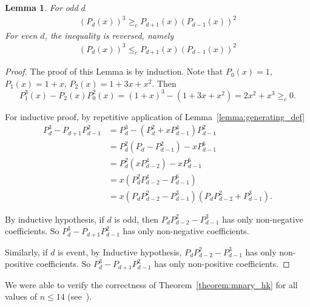 \documentclass{amsart}
\newtheorem{lemma}[theorem]{Lemma}
\theoremstyle{definition}
\begin{document}
\begin{lemma}
	For odd $d$
	\begin{align*}
		(P_{d }(x))^3 \geq_{c}  P_{d +1}(x)(P_{d -1}(x))^2
	\end{align*}
	For even $d$, the inequality is reversed, namely
	\begin{align*}
		(P_{d}(x))^3 \leq_{c}  P_{d +1}(x)(P_{d - 1}(x))^2
	\end{align*}
\end{lemma}
\begin{proof}
	The proof of this Lemma is by induction. Note that $P_{0}(x)=1$, $P_{1}(x)=1+x$, $P_2(x)=1+3x+x^2$. Then $$P_{1}^3(x)-P_{2}(x)P_{0}^2(x)=(1+x)^3-(1+3x+x^2)=2x^2+x^3\geq_{c}0.$$

	For inductive proof, by repetitive application of Lemma~\ref{lemma:generating_def}
	\begin{align*}
		P_{d}^{3}-P_{d+1}P_{d-1}^2 & =P_{d}^{3}-(P_{d}^2+xP_{d-1}^4)P_{d-1}^2                       \\
		                           & =P_{d}^2(P_{d}-P_{d-1}^2)-xP_{d-1}^6                           \\
		                           & = P_{d}^2(xP_{d-2}^4)-xP_{d-1}^{6}                             \\
		                           & = x(P_{d}^2 P_{d-2}^4 - P_{d-1}^6)                             \\
		                           & = x(P_{d} P_{d-2}^2 - P_{d-1}^3)(P_{d} P_{d-2}^2 + P_{d-1}^3).
	\end{align*}

	By inductive hypothesis, if $d$ is odd, then $P_{d} P_{d-2}^2 - P_{d-1}^3$ has only non-negative coefficients. So $P_{d}^{3}-P_{d+1}P_{d-1}^2$ has only non-negative coefficients.

	Similarly, if $d$ is event, by Inductive hypothesis, $P_{d} P_{d-2}^2 - P_{d-1}^3$ has only non-positive coefficients. So $P_{d}^{3}-P_{d+1}P_{d-1}^2$ has only non-positive coefficients.

\end{proof}

We were able to verify the correctness of Theorem~\ref{theorem:mnary_hk} for all values of $n\leq 14$ (see~\cite{Atishaya:Github}).

\newpage
\end{document}
